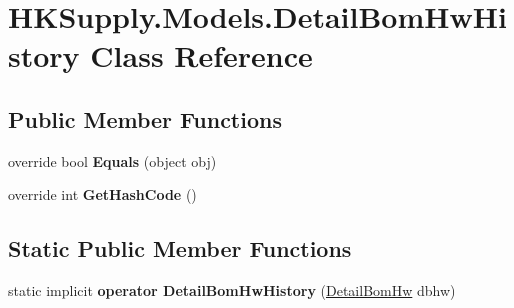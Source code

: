 \hypertarget{class_h_k_supply_1_1_models_1_1_detail_bom_hw_history}{}\section{H\+K\+Supply.\+Models.\+Detail\+Bom\+Hw\+History Class Reference}
\label{class_h_k_supply_1_1_models_1_1_detail_bom_hw_history}
\subsection*{Public Member Functions}
\begin{DoxyCompactItemize}
\item 
\mbox{\label{class_h_k_supply_1_1_models_1_1_detail_bom_hw_history_a188ccdd1dbed8290d75102068c138bb7}} 
override bool {\bfseries Equals} (object obj)
\item 
\mbox{\label{class_h_k_supply_1_1_models_1_1_detail_bom_hw_history_adde7b38675f7dd7c88259b55280d7ebb}} 
override int {\bfseries Get\+Hash\+Code} ()
\end{DoxyCompactItemize}
\subsection*{Static Public Member Functions}
\begin{DoxyCompactItemize}
\item 
\mbox{\label{class_h_k_supply_1_1_models_1_1_detail_bom_hw_history_a0248a10d87589b14570757b4900af5de}} 
static implicit {\bfseries operator Detail\+Bom\+Hw\+History} (\mbox{\hyperlink{class_h_k_supply_1_1_models_1_1_detail_bom_hw}{Detail\+Bom\+Hw}} dbhw)
\end{DoxyCompactItemize}
